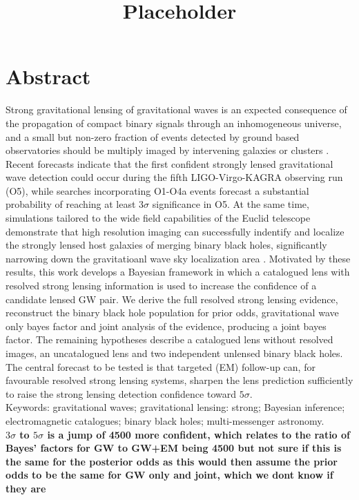 \documentclass[pdflatex,sn-mathphys-num]{sn-jnl}%
\theoremstyle{thmstyleone}%
\theoremstyle{thmstyletwo}%
\theoremstyle{thmstylethree}%
\begin{document}
\title[Article Title]{Placeholder}

\author{\fnm{} \sur{}}

\maketitle

\section*{Abstract}
Strong gravitational lensing of gravitational waves is an expected consequence of the propagation of compact binary signals through an inhomogeneous universe, and a small but non-zero fraction of events detected by ground based observatories should be multiply imaged by intervening galaxies or clusters \cite{2}\cite{6}\cite{18}\cite{19}.
Recent forecasts indicate that the first confident strongly lensed gravitational wave detection could occur during the fifth LIGO-Virgo-KAGRA observing run (O5)\cite{19}, while searches incorporating O1-O4a events forecast a substantial probability of reaching at least $3\sigma$ significance in O5\cite{20}.
At the same time, simulations tailored to the wide field capabilities of the Euclid telescope demonstrate that high resolution imaging can successfully indentify and localize the strongly lensed host galaxies of merging binary black holes, significantly narrowing down the gravitatioanl wave sky localization area \cite{27}.
Motivated by these results, this work develops a Bayesian framework in which a catalogued lens with resolved strong lensing information is used to increase the confidence of a candidate lensed GW pair.
We derive the full resolved strong lensing evidence, reconstruct the binary black hole population for prior odds, gravitational wave only bayes factor and joint analysis of the evidence, producing a joint bayes factor. The remaining hypotheses describe a catalogued lens without resolved images, an uncatalogued lens and two independent unlensed binary black holes.
The central forecast to be tested is that targeted (EM) follow-up can, for favourable resolved strong lensing systems, sharpen the lens prediction sufficiently to raise the strong lensing detection confidence toward $5\sigma$.\\
Keywords: gravitational waves; gravitational lensing: strong; Bayesian inference; electromagnetic catalogues; binary black holes; multi-messenger astronomy.\\
\textbf{$3\sigma$ to $5\sigma$ is a jump of 4500 more confident, which relates to the ratio of Bayes' factors for GW to GW+EM being 4500 but not sure if this is the same for the posterior odds as this would then assume the prior odds to be the same for GW only and joint, which we dont know if they are}
\end{document}
